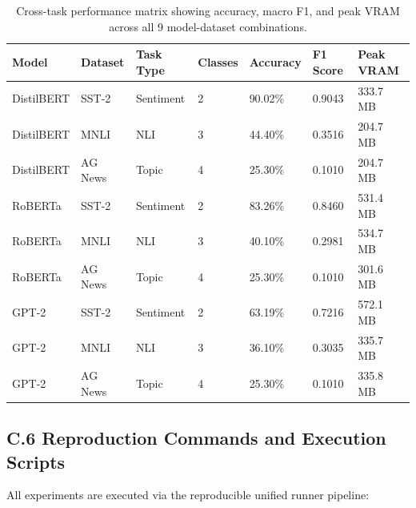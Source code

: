 \begin{table}[H]
\centering
\small
\begin{tabular}{lllllll}
\toprule
\textbf{Model} & \textbf{Dataset} & \textbf{Task Type} & \textbf{Classes} & \textbf{Accuracy} & \textbf{F1 Score} & \textbf{Peak VRAM} \\
\midrule
DistilBERT & SST-2    & Sentiment & 2 & 90.02\% & 0.9043 & 333.7 MB \\
DistilBERT & MNLI     & NLI       & 3 & 44.40\% & 0.3516 & 204.7 MB \\
DistilBERT & AG News  & Topic     & 4 & 25.30\% & 0.1010 & 204.7 MB \\
RoBERTa    & SST-2    & Sentiment & 2 & 83.26\% & 0.8460 & 531.4 MB \\
RoBERTa    & MNLI     & NLI       & 3 & 40.10\% & 0.2981 & 534.7 MB \\
RoBERTa    & AG News  & Topic     & 4 & 25.30\% & 0.1010 & 301.6 MB \\
GPT-2      & SST-2    & Sentiment & 2 & 63.19\% & 0.7216 & 572.1 MB \\
GPT-2      & MNLI     & NLI       & 3 & 36.10\% & 0.3035 & 335.7 MB \\
GPT-2      & AG News  & Topic     & 4 & 25.30\% & 0.1010 & 335.8 MB \\
\bottomrule
\end{tabular}
\caption{Cross-task performance matrix showing accuracy, macro F1, and peak VRAM across all 9 model-dataset combinations.}
\label{tab:c_multitask_matrix}
\end{table}

\subsection{C.6 Reproduction Commands and Execution Scripts}
\label{sec:app_reproduction}

All experiments are executed via the reproducible unified runner pipeline:

